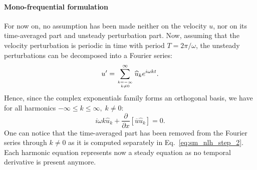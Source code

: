 \paragraph{Mono-frequential formulation}
For now on, no assumption has been made neither on the velocity $u$,
nor on its time-averaged part and unsteady perturbation part.
Now, assuming that the velocity perturbation 
is periodic in time with period
$T=2 \pi / \omega$,
the unsteady perturbations can be decomposed into 
a Fourier series:
\begin{equation}
	u^\prime = \sum_{k=-\infty \atop k \neq 0}^{\infty} 
	\widehat{u}_k e^{i \omega k t}.
	\label{eq:sm_nlh_decomposition_pert}
\end{equation}
Hence, since the complex exponentials family forms 
an orthogonal basis, we have for all harmonics 
$-\infty \leq k \leq \infty, \; k \neq 0$:
\begin{equation}
	i \omega k \widehat{u}_k + 
	\frac{\partial}{\partial x} \left[ \overline{u} \widehat{u}_k\right] =
	0.
\end{equation}
One can notice that the time-averaged part has been removed from
the Fourier series through $k \neq 0$ as it is computed 
separately in Eq.~\ref{eq:sm_nlh_step_2}.
Each harmonic equation represents now a steady equation as no temporal
derivative is present anymore.

